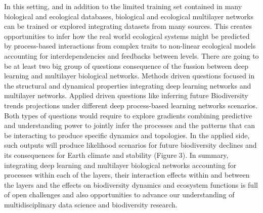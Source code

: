 \documentclass[authoryear,1p,12pt]{elsarticle}
\begin{document}
In this setting, and in addition to the limited training set contained
in many biological and ecological databases, biological and ecological
multilayer networks can be trained or explored integrating datasets
from many sources. This creates opportunities to infer how the real
world ecological systems might be predicted by process-based
interactions from complex traits to non-linear ecological models
accounting for interdependencies and feedbacks between levels. There
are going to be at least two big group of questions consequence of the
fussion between deep learning and multilayer biological
networks. Methods driven questions focused in the structural and
dynamical properties integrating deep learning networks and multilayer
networks. Applied driven questions like inferring future Biodiversity
trends projections under different deep process-based learning
networks scenarios. Both types of questions would require to explore
gradients combining predictive and understanding power to jointly
infer the processes and the patterns that can be interacting to
produce specific dynamics and topologies. In the applied side, such
outputs will produce likelihood scenarios for future biodiversity
declines and its consequences for Earth climate and stability (Figure
3). In summary, integrating deep learning and multilayer biological
networks accounting for processes within each of the layers, their
interaction effects within and between the layers and the effects on
biodiversity dynamics and ecosystem functions is full of open
challenges and also opportunities to advance our understanding of
multidisciplinary data science and biodiversity research.
     
\end{document}
